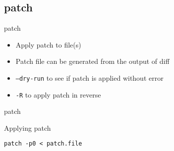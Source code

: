 \subsection{patch}

\begin{frame}[fragile]{patch}
  \begin{itemize}
    \pause \item Apply patch to file(s)
    \pause \item Patch file can be generated from the output of diff
    \pause \item \texttt{--dry-run} to see if patch is applied without error
    \pause \item \texttt{-R} to apply patch in reverse
  \end{itemize}
\end{frame}

\begin{frame}[fragile]{patch}
  \begin{exampleblock}{Applying patch}
    \begin{lstlisting}[showstringspaces=false,basicstyle=\tiny]
patch -p0 < patch.file
    \end{lstlisting}
  \end{exampleblock}
\end{frame}
